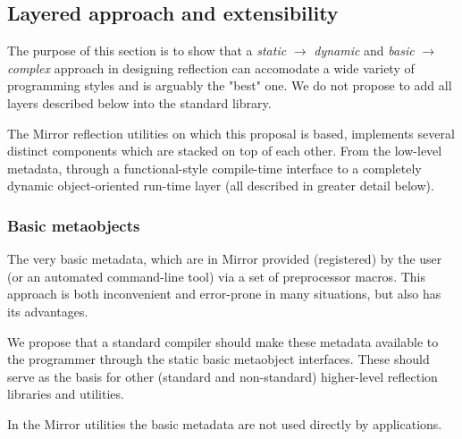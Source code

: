\subsection{Layered approach and extensibility}

The purpose of this section is to show that a {\em static} $\to$ {\em dynamic}
and {\em basic} $\to$ {\em complex} approach in designing reflection
can accomodate a wide variety of programming styles and is arguably
the "best" one. We do not propose to add all layers described
below into the standard library.

The Mirror reflection utilities \cite{mirror-doc-cpp11} on which this
proposal is based, implements several distinct components which
are stacked on top of each other. From the low-level metadata, through
a functional-style compile-time interface to a completely dynamic
object-oriented run-time layer (all described in greater detail below).

\subsubsection{Basic metaobjects}
The very basic metadata, which are in Mirror
provided (registered) by the user (or an automated command-line tool) via a set
of preprocessor macros. This approach is both inconvenient and error-prone
in many situations, but also has its advantages.

We propose that a standard compiler should make these metadata available
to the programmer through the static basic metaobject interfaces. These should
serve as the basis for other (standard and non-standard) higher-level
reflection libraries and utilities.

In the Mirror utilities the basic metadata are not used directly by
applications.



